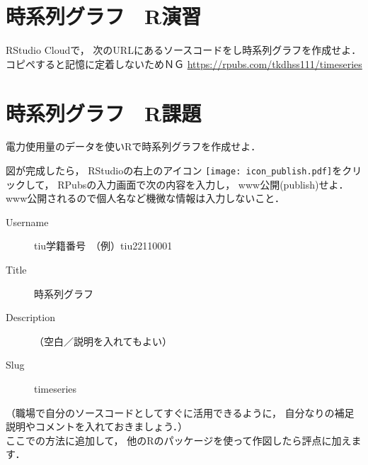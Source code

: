 {
}

{
}

{
}

\section{時系列グラフ　R演習}

\MyFrame{\insertsection}
{
  RStudio Cloudで，
  次のURLにあるソースコードをし時系列グラフを作成せよ．
  \alert{コピペすると記憶に定着しないためＮＧ}
  \url{https://rpubs.com/tkdhss111/timeseries}
}

\MyFrame{}
{

}

\MyFrame{}
{

}

\MyFrame{}
{

}

\section{時系列グラフ　R課題}

{
  電力使用量のデータを使いRで時系列グラフを作成せよ．
}

{
}

\MyFrame{\insertsection}
{
  図が完成したら，
  RStudioの右上のアイコン
  \texttt{[image: icon\_publish.pdf]}をクリックして，
  RPubsの入力画面で次の内容を入力し，
  www公開(publish)せよ．\\
  \alert{www公開されるので個人名など機微な情報は入力しないこと．}
  \begin{description}
    \item[Username] tiu学籍番号　（例）tiu22110001\\
    \item[Title] 時系列グラフ\\
    \item[Description] （空白／説明を入れてもよい）\\
    \item[Slug] timeseries
  \end{description}
  （職場で自分のソースコードとしてすぐに活用できるように，
    自分なりの補足説明やコメントを入れておきましょう．）\\
    ここでの方法に追加して，
    他のRのパッケージを使って作図したら評点に加えます．
}

